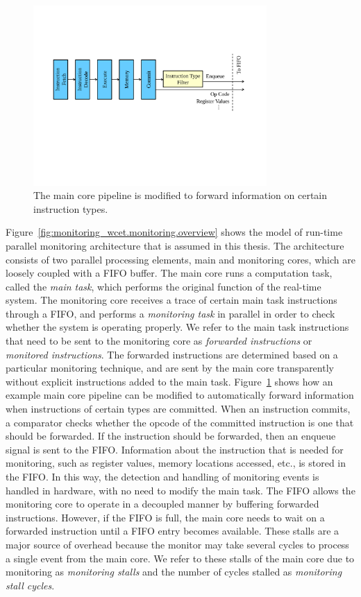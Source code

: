 \begin{figure}
  \begin{center}
    \includegraphics[width=3.5in]{monitoring_wcet/figs/monitoring.pdf}
    \caption{The main core pipeline is modified to forward information on certain
    instruction types.}
    \label{fig:monitoring_wcet.monitoring.forwarding}
  \end{center}
\end{figure}

Figure~\ref{fig:monitoring_wcet.monitoring.overview} shows the model of
run-time parallel monitoring architecture that is assumed in this thesis. The
architecture consists of two parallel processing elements, main and monitoring
cores, which are loosely coupled with a FIFO buffer.  The main core runs a
computation task, called the {\em main task}, which performs the original
function of the real-time system.  The monitoring core receives a trace of
certain main task instructions through a FIFO, and performs a {\em monitoring
task} in parallel in order to check whether the system is operating properly.
We refer to the main task instructions that need to be sent to the monitoring
core as {\em forwarded instructions} or {\em monitored instructions}. The
forwarded instructions are determined based on a particular monitoring
technique, and are sent by the main core transparently without explicit
instructions added to the main task.
Figure~\ref{fig:monitoring_wcet.monitoring.forwarding} shows how an example
main core pipeline can be modified to automatically forward information when
instructions of certain types are committed. When an instruction commits, a
comparator checks whether the opcode of the committed instruction is one that
should be forwarded. If the instruction should be forwarded, then an enqueue
signal is sent to the FIFO.  Information about the instruction that is needed
for monitoring, such as register values, memory locations accessed, etc., is
stored in the FIFO. In this way, the detection and handling of monitoring
events is handled in hardware, with no need to modify the main task.  The FIFO
allows the monitoring core to operate in a decoupled manner by buffering
forwarded instructions.  However, if the FIFO is full, the main core needs to
wait on a forwarded instruction until a FIFO entry becomes available.  These
stalls are a major source of overhead because the monitor may take several
cycles to process a single event from the main core.  We refer to these stalls
of the main core due to monitoring as {\em monitoring stalls} and the number of
cycles stalled as {\em monitoring stall cycles}.

